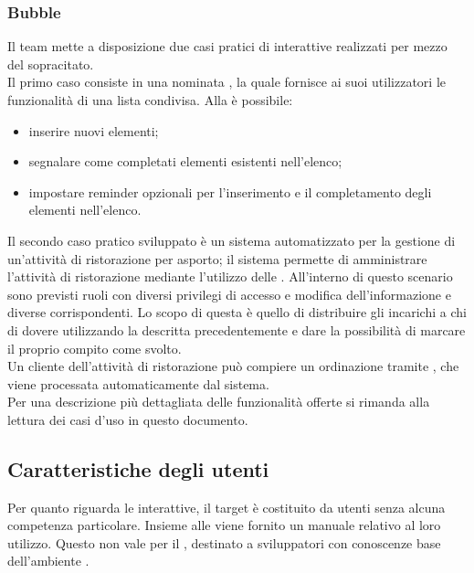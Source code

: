 \subsubsection{Bubble}
Il team \GroupName{} mette a disposizione due casi pratici di  interattive realizzati per mezzo del  sopracitato.\\
Il primo caso consiste in una  nominata , la quale fornisce ai suoi utilizzatori le funzionalità di una lista condivisa. Alla  è possibile:
\begin{itemize}
	\item inserire nuovi elementi;
	\item segnalare come completati elementi esistenti nell'elenco;
	\item impostare reminder opzionali per l'inserimento e il completamento degli elementi nell'elenco.
\end{itemize}
Il secondo caso pratico sviluppato è un sistema automatizzato per la gestione di un'attività di ristorazione per asporto; il sistema permette di amministrare l'attività di ristorazione mediante l'utilizzo delle . All'interno di questo scenario sono previsti ruoli con diversi privilegi di accesso e modifica dell'informazione e diverse  corrispondenti.
Lo scopo di questa  è quello di distribuire gli incarichi a chi di dovere utilizzando la   descritta precedentemente e dare la possibilità di marcare il proprio compito come svolto.\\
Un cliente dell'attività di ristorazione può compiere un ordinazione tramite , che viene processata automaticamente dal sistema.\\
Per una descrizione più dettagliata delle funzionalità offerte si rimanda alla lettura dei casi d'uso in questo documento.

\subsection{Caratteristiche degli utenti}
Per quanto riguarda le  interattive, il target è costituito da utenti senza alcuna competenza particolare. Insieme alle  viene fornito un manuale relativo al loro utilizzo. Questo non vale per il , destinato a sviluppatori con conoscenze base dell'ambiente . 


